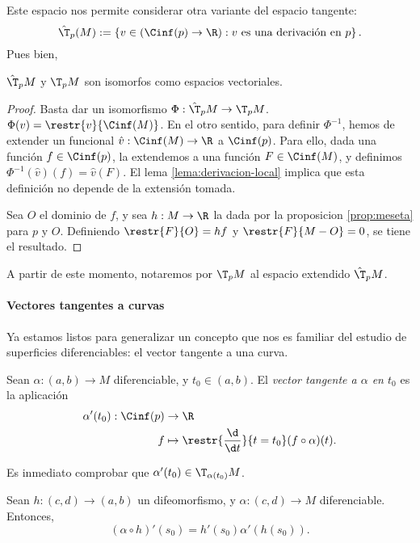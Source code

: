 Este espacio nos permite considerar otra variante del espacio tangente:
\[
  \hat{\T}_{p}(M) := \left\{ v\in(\Cinf(p)\to\R) :
        v\text{ es una derivación en $p$}
\right\}
.\]
Pues bien,
\begin{nth}
  $\hat{\T}_{p}M$ y $\T_{p}M$ son isomorfos como espacios vectoriales.
\end{nth}
\begin{proof}
  Basta dar un isomorfismo $\Phi:\hat{\T}_{p}M\to \T_{p}M$. $\Phi(v) =
  \restr{v}{\Cinf(M)}$. En el otro sentido, para definir $\Phi^{-1}$, hemos de
  extender un funcional $\hat{v}: \Cinf(M)\to\R$ a $\Cinf(p)$. Para ello, dada
  una función $f\in\Cinf(p)$, la extendemos a una función $F\in\Cinf(M)$, y
  definimos $\Phi^{-1}(\hat{v})(f) = \hat{v}(F)$. El lema
  \ref{lema:derivacion-local} implica que esta definición no depende de la
  extensión tomada.

  Sea $O$ el dominio de $f$, y sea $h:M\to\R$ la dada por la proposicion
  \ref{prop:meseta} para $p$ y $O$. Definiendo $\restr{F}{O} = hf$ y
  $\restr{F}{M-O} = 0$, se tiene el resultado.
\end{proof}
A partir de este momento, notaremos por $\T_{p}M$ al espacio extendido
$\hat{\T}_{p}M$.

\paragraph{Vectores tangentes a curvas}
Ya estamos listos para generalizar un concepto que nos es familiar del estudio
de superficies diferenciables: el vector tangente a una curva.
\begin{ndef}
  Sean $\alpha:(a,b)\to M$ diferenciable, y $t_{0}\in(a,b)$. El \emph{vector
    tangente a $\alpha$ en $t_{0}$} es la aplicación
    \begin{alignat*}{2}
      \alpha'(t_{0}): \Cinf(p) & \to \R \\
      f & \mapsto \restr{\frac{\d}{\d t}}{t = t_{0}}(f\circ\alpha)(t).
    \end{alignat*}
\end{ndef}
Es inmediato comprobar que $\alpha'(t_{0})\in \T_{\alpha(t_{0})}M$.

\begin{nprop}
  Sean $h:(c,d)\to(a,b)$ un difeomorfismo, y $\alpha:(c,d)\to M$
  diferenciable. Entonces,
  \[
    (\alpha\circ h)'(s_{0}) = h'(s_{0})\alpha'(h(s_{0}))
  .\]
\end{nprop}

